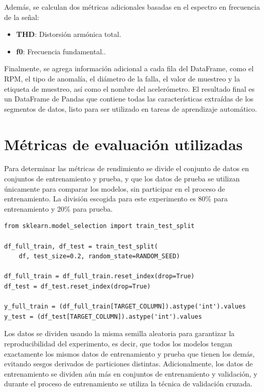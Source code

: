 \documentclass[11pt,a4paper,spanish]{book}
\numberwithin{equation}{chapter}
\numberwithin{figure}{chapter}
\begin{document}
Además, se calculan dos métricas adicionales basadas en el espectro en frecuencia de la señal:

\begin{itemize}
\item \textbf{THD}: Distorsión armónica total.
\item \textbf{f0}: Frecuencia fundamental..
\end{itemize}


Finalmente, se agrega información adicional a cada fila del DataFrame, como el RPM, el tipo de anomalía, el diámetro de la falla, el valor de muestreo y la etiqueta de muestreo, así como el nombre del acelerómetro. El resultado final es un DataFrame de Pandas que contiene todas las características extraídas de los segmentos de datos, listo para ser utilizado en tareas de aprendizaje automático.



\section{Métricas de evaluación utilizadas}


Para determinar las métricas de rendimiento se divide el conjunto de datos en conjuntos de entrenamiento y prueba, y que los datos de prueba se utilizan únicamente para comparar los modelos, sin participar en el proceso de entrenamiento. La división escogida para este experimento es 80\% para entrenamiento y 20\% para prueba. 


\begin{lstlisting}
from sklearn.model_selection import train_test_split

df_full_train, df_test = train_test_split(
    df, test_size=0.2, random_state=RANDOM_SEED)

df_full_train = df_full_train.reset_index(drop=True)
df_test = df_test.reset_index(drop=True)

y_full_train = (df_full_train[TARGET_COLUMN]).astype('int').values
y_test = (df_test[TARGET_COLUMN]).astype('int').values
\end{lstlisting}


Los datos se dividen usando la misma semilla aleatoria para garantizar la reproducibilidad del experimento, es decir, que todos los modelos tengan exactamente los mismos datos de entrenamiento y prueba que tienen los demás, evitando sesgos derivados de particiones distintas. Adicionalmente, los datos de entrenamiento se dividen aún más en conjuntos de entrenamiento y validación, y durante el proceso de entrenamiento se utiliza la técnica de validación cruzada. 
\end{document}
